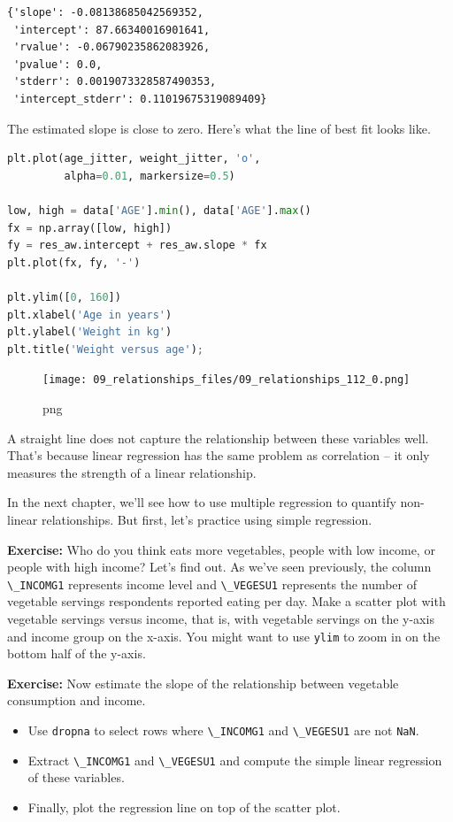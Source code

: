 \documentclass[
]{book}
\newcommand{\passthrough}[1]{#1}
\begin{document}
\begin{lstlisting}
{'slope': -0.08138685042569352,
 'intercept': 87.66340016901641,
 'rvalue': -0.06790235862083926,
 'pvalue': 0.0,
 'stderr': 0.0019073328587490353,
 'intercept_stderr': 0.11019675319089409}
\end{lstlisting}

The estimated slope is close to zero. Here's what the line of best fit
looks like.

\begin{lstlisting}[language=Python]
plt.plot(age_jitter, weight_jitter, 'o', 
         alpha=0.01, markersize=0.5)

low, high = data['AGE'].min(), data['AGE'].max()
fx = np.array([low, high])
fy = res_aw.intercept + res_aw.slope * fx
plt.plot(fx, fy, '-')

plt.ylim([0, 160])
plt.xlabel('Age in years')
plt.ylabel('Weight in kg')
plt.title('Weight versus age');
\end{lstlisting}

\begin{figure}
\centering
\texttt{[image: 09\_relationships\_files/09\_relationships\_112\_0.png]}
\caption{png}
\end{figure}

A straight line does not capture the relationship between these
variables well. That's because linear regression has the same problem as
correlation -- it only measures the strength of a linear relationship.

In the next chapter, we'll see how to use multiple regression to
quantify non-linear relationships. But first, let's practice using
simple regression.

\textbf{Exercise:} Who do you think eats more vegetables, people with
low income, or people with high income? Let's find out. As we've seen
previously, the column \passthrough{\lstinline!\_INCOMG1!} represents
income level and \passthrough{\lstinline!\_VEGESU1!} represents the
number of vegetable servings respondents reported eating per day. Make a
scatter plot with vegetable servings versus income, that is, with
vegetable servings on the y-axis and income group on the x-axis. You
might want to use \passthrough{\lstinline!ylim!} to zoom in on the
bottom half of the y-axis.

\textbf{Exercise:} Now estimate the slope of the relationship between
vegetable consumption and income.

\begin{itemize}
\item
  Use \passthrough{\lstinline!dropna!} to select rows where
  \passthrough{\lstinline!\_INCOMG1!} and
  \passthrough{\lstinline!\_VEGESU1!} are not
  \passthrough{\lstinline!NaN!}.
\item
  Extract \passthrough{\lstinline!\_INCOMG1!} and
  \passthrough{\lstinline!\_VEGESU1!} and compute the simple linear
  regression of these variables.
\item
  Finally, plot the regression line on top of the scatter plot.
\end{itemize}
\end{document}
